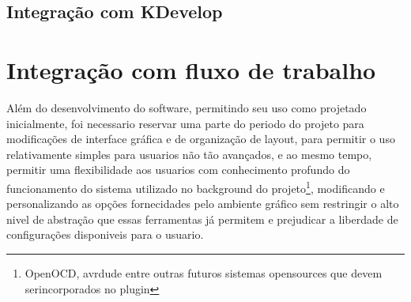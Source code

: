 \subsection{Integração com KDevelop}

\section{Integração com fluxo de trabalho}
Além do desenvolvimento do software, permitindo seu uso como projetado inicialmente, foi necessario reservar uma parte do periodo
do projeto para modificações de interface gráfica e de organização de layout, para permitir o uso relativamente simples para usuarios
não tão avançados, e ao mesmo tempo, permitir uma flexibilidade aos usuarios com conhecimento profundo do funcionamento do sistema
utilizado no background do projeto\footnote{OpenOCD, avrdude entre outras futuros sistemas opensources que devem serincorporados no
plugin}, modificando e personalizando as opções fornecidades pelo ambiente gráfico sem restringir o alto nivel de abstração que essas
ferramentas já permitem e prejudicar a liberdade de configurações disponiveis para o usuario.
